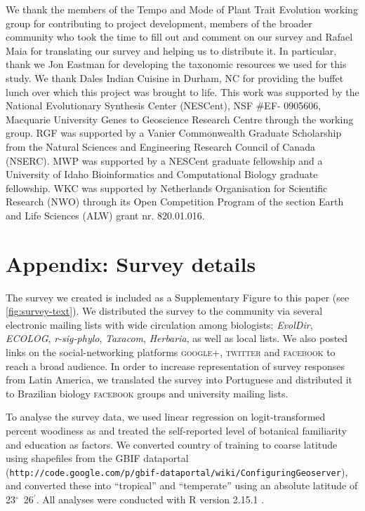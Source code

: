 \documentclass[a4paper,12pt]{article}
\begin{document}
We thank the members of the Tempo and Mode of Plant Trait
Evolution working group for contributing to project development,
members of the broader community who took the time to fill out and
comment on our survey and Rafael Maia for translating our survey and
helping us to distribute it.  In particular, thank we Jon Eastman for 
developing the taxonomic resources we used for this study.
%
We thank Dales Indian Cuisine in Durham, NC for providing the buffet
lunch over which this project was brought to life.
%
This work was supported by the National Evolutionary Synthesis Center
(NESCent), NSF \#EF- 0905606, Macquarie University Genes to Geoscience
Research Centre through the working group.
%
RGF was supported by a Vanier Commonwealth Graduate Scholarship from
the Natural Sciences and Engineering Research Council of Canada
(NSERC).
MWP was supported by a NESCent graduate fellowship and a 
University of Idaho Bioinformatics and Computational Biology graduate fellowship.
%
WKC was supported by Netherlands Organisation for
Scientific Research (NWO) through its Open Competition Program of the
section Earth and Life Sciences (ALW) grant nr. 820.01.016.

\section{Appendix: Survey details}
%
The survey we created is included as a Supplementary Figure to
this paper (see \ref{fig:survey-text}). We distributed the survey to the 
community via several electronic
mailing lists with wide circulation among biologists: \emph{EvolDir},
\emph{ECOLOG}, \emph{\mbox{r-sig-phylo}}, \emph{Taxacom},
\emph{Herbaria}, as well as local lists. We also posted links on the
social-networking platforms \textsc{google+}, \textsc{twitter} and
\textsc{facebook} to reach a broad audience.
%
In order to increase representation of survey responses from Latin
America, we translated the survey into Portuguese and distributed it
to Brazilian biology \textsc{facebook} groups and university mailing
lists.

To analyse the survey data, we used linear regression on
logit-transformed percent woodiness as \citep[see][]{wartonarcsine}
and treated the self-reported level of botanical familiarity and
education as factors.  We converted country of training to coarse
latitude using shapefiles
from the GBIF dataportal\\
(\texttt{http://code.google.com/p/gbif-dataportal/wiki/ConfiguringGeoserver}),
and converted these into ``tropical'' and ``temperate'' using an
absolute latitude of 23$^\circ$~26$^\prime$.  All analyses were
conducted with R version 2.15.1 \citep{R}.
\end{document}
